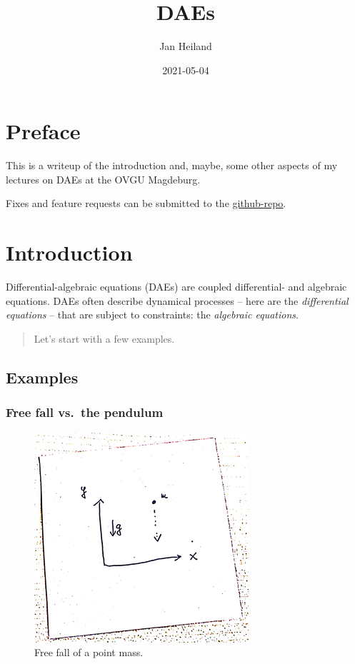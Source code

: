 \documentclass[]{book}
\title{DAEs}
\author{Jan Heiland}
\institute{OVGU/MPI}
\date{2021-05-04}
\newenvironment {JHSAYS} [0] {\begin{quote}\color{jhsc}} {\end{quote}}
\theoremstyle{definition}
\theoremstyle{definition}
\theoremstyle{definition}
\theoremstyle{definition}
\theoremstyle{remark}
\begin{document}
\maketitle

{
\setcounter{tocdepth}{1}
\tableofcontents
}
\hypertarget{preface}{%
\chapter*{Preface}\label{preface}}

This is a writeup of the introduction and, maybe, some other aspects of my lectures on DAEs at the OVGU Magdeburg.

Fixes and feature requests can be submitted to the \href{https://github.com/highlando/script-daes}{github-repo}.

\newcommand{\ind}{\operatorname{ind}}
\newcommand{\rank}{\operatorname{rank}}

\hypertarget{introduction}{%
\chapter{Introduction}\label{introduction}}

Differential-algebraic equations (DAEs) are coupled differential- and algebraic equations. DAEs often describe dynamical processes -- here are the \emph{differential equations} -- that are subject to constraints: the \emph{algebraic equations}.

\begin{JHSAYS}
Let's start with a few examples.
\end{JHSAYS}

\hypertarget{examples}{%
\section{Examples}\label{examples}}

\hypertarget{free-fall-vs.-the-pendulum}{%
\subsection*{Free fall vs.~the pendulum}\label{free-fall-vs.-the-pendulum}}

\begin{figure}

{\centering \includegraphics[width=0.4\linewidth]{pics/freefall} 

}

\caption{Free fall of a point mass.}\label{fig:free-fall}
\end{figure}
\end{document}
